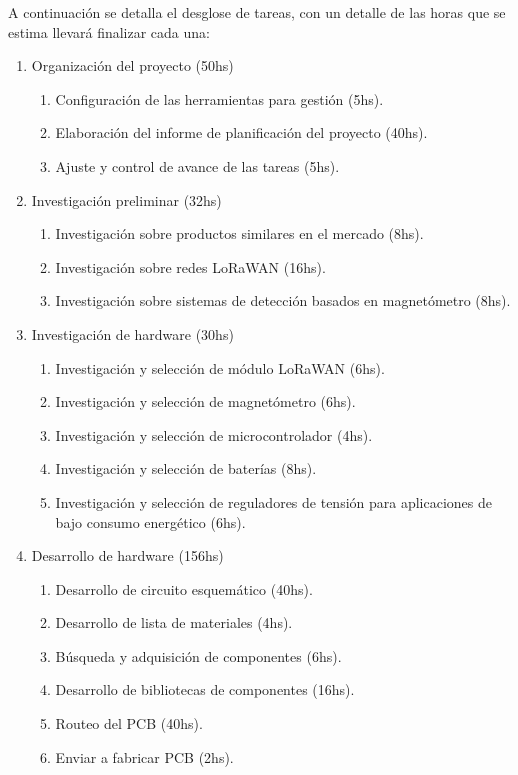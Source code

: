 \documentclass[
11pt, %
]{charter}
\begin{document}
A continuación se detalla el desglose de tareas, con un detalle de las horas que se estima llevará finalizar cada una:
	\begin{enumerate}
		\item Organización del proyecto (50hs)
			\begin{enumerate}
				\item Configuración de las herramientas para gestión (5hs). 
				\item Elaboración del informe de planificación del proyecto (40hs).
				\item Ajuste y control de avance de las tareas (5hs).
			\end{enumerate}
		\item Investigación preliminar (32hs)
			\begin{enumerate}
				\item Investigación sobre productos similares en el mercado (8hs).
				\item Investigación sobre redes LoRaWAN (16hs).
				\item Investigación sobre sistemas de detección basados en magnetómetro (8hs).
			\end{enumerate}
		\item Investigación de hardware (30hs)
			\begin{enumerate}
				\item Investigación y selección de módulo LoRaWAN (6hs).
				\item Investigación y selección de magnetómetro (6hs).
				\item Investigación y selección de microcontrolador (4hs).
				\item Investigación y selección de baterías (8hs).
				\item Investigación y selección de reguladores de tensión para aplicaciones de bajo consumo energético (6hs).
			\end{enumerate}
		\item Desarrollo de hardware (156hs)
			\begin{enumerate}
				\item Desarrollo de circuito esquemático (40hs).
				\item Desarrollo de lista de materiales (4hs).
				\item Búsqueda y adquisición de componentes (6hs).
				\item Desarrollo de bibliotecas de componentes (16hs).
				\item Routeo del PCB (40hs).
				\item Enviar a fabricar PCB (2hs).

\end{enumerate}
\end{enumerate}
\end{document}
